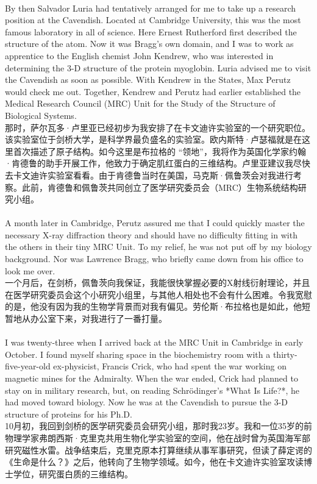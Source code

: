 \documentclass{article}
\begin{document}
\\
By then Salvador Luria had tentatively arranged for me to take up a research position at the Cavendish. Located at Cambridge University, this was the most famous laboratory in all of science. Here Ernest Rutherford first described the structure of the atom. Now it was Bragg’s own domain, and I was to work as apprentice to the English chemist John Kendrew, who was interested in determining the 3-D structure of the protein myoglobin. Luria advised me to visit the Cavendish as soon as possible. With Kendrew in the States, Max Perutz would check me out. Together, Kendrew and Perutz had earlier established the Medical Research Council (MRC) Unit for the Study of the Structure of Biological Systems.\\
那时，萨尔瓦多·卢里亚已经初步为我安排了在卡文迪许实验室的一个研究职位。该实验室位于剑桥大学，是科学界最负盛名的实验室。欧内斯特·卢瑟福就是在这里首次描述了原子结构。如今这里是布拉格的 “领地”，我将作为英国化学家约翰·肯德鲁的助手开展工作，他致力于确定肌红蛋白的三维结构。卢里亚建议我尽快去卡文迪许实验室看看。由于肯德鲁当时在美国，马克斯·佩鲁茨会对我进行考察。此前，肯德鲁和佩鲁茨共同创立了医学研究委员会（MRC）生物系统结构研究小组。\\

\\
A month later in Cambridge, Perutz assured me that I could quickly master the necessary X-ray diffraction theory and should have no difficulty fitting in with the others in their tiny MRC Unit. To my relief, he was not put off by my biology background. Nor was Lawrence Bragg, who briefly came down from his office to look me over.\\
一个月后，在剑桥，佩鲁茨向我保证，我能很快掌握必要的X射线衍射理论，并且在医学研究委员会这个小研究小组里，与其他人相处也不会有什么困难。令我宽慰的是，他没有因为我的生物学背景而对我有偏见。劳伦斯·布拉格也是如此，他短暂地从办公室下来，对我进行了一番打量。\\

\\
I was twenty-three when I arrived back at the MRC Unit in Cambridge in early October. I found myself sharing space in the biochemistry room with a thirty-five-year-old ex-physicist, Francis Crick, who had spent the war working on magnetic mines for the Admiralty. When the war ended, Crick had planned to stay on in military research, but, on reading Schrödinger’s *What Is Life?*, he had moved toward biology. Now he was at the Cavendish to pursue the 3-D structure of proteins for his Ph.D.\\
10月初，我回到剑桥的医学研究委员会研究小组，那时我23岁。我和一位35岁的前物理学家弗朗西斯·克里克共用生物化学实验室的空间，他在战时曾为英国海军部研究磁性水雷。战争结束后，克里克原本打算继续从事军事研究，但读了薛定谔的《生命是什么？》之后，他转向了生物学领域。如今，他在卡文迪许实验室攻读博士学位，研究蛋白质的三维结构。\\
\end{document}
